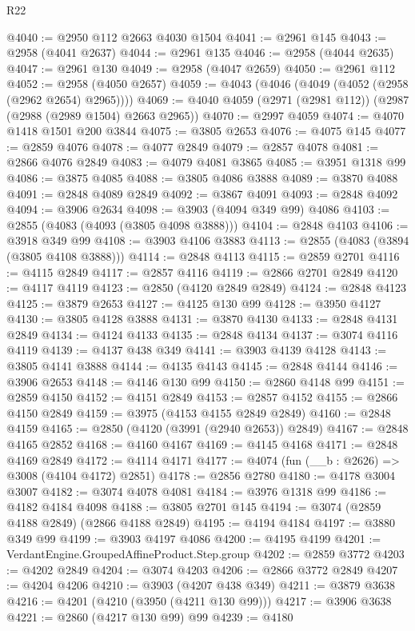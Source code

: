 \begin{lexlean}{R22}
\begin{coremodule}
@4040 := @2950 @112 @2663 @4030 @1504
@4041 := @2961 @145
@4043 := @2958 (@4041 @2637)
@4044 := @2961 @135
@4046 := @2958 (@4044 @2635)
@4047 := @2961 @130
@4049 := @2958 (@4047 @2659)
@4050 := @2961 @112
@4052 := @2958 (@4050 @2657)
@4059 := @4043 (@4046 (@4049 (@4052 (@2958 (@2962 @2654) @2965))))
@4069 := @4040 @4059 (@2971 (@2981 @112)) (@2987 (@2988 (@2989 @1504) @2663 @2965))
@4070 := @2997 @4059
@4074 := @4070 @1418 @1501 @200 @3844
@4075 := @3805 @2653
@4076 := @4075 @145
@4077 := @2859 @4076
@4078 := @4077 @2849
@4079 := @2857 @4078
@4081 := @2866 @4076 @2849
@4083 := @4079 @4081 @3865
@4085 := @3951 @1318 @99
@4086 := @3875 @4085
@4088 := @3805 @4086 @3888
@4089 := @3870 @4088
@4091 := @2848 @4089 @2849
@4092 := @3867 @4091
@4093 := @2848 @4092
@4094 := @3906 @2634
@4098 := @3903 (@4094 @349 @99) @4086
@4103 := @2855 (@4083 (@4093 (@3805 @4098 @3888)))
@4104 := @2848 @4103
@4106 := @3918 @349 @99
@4108 := @3903 @4106 @3883
@4113 := @2855 (@4083 (@3894 (@3805 @4108 @3888)))
@4114 := @2848 @4113
@4115 := @2859 @2701
@4116 := @4115 @2849
@4117 := @2857 @4116
@4119 := @2866 @2701 @2849
@4120 := @4117 @4119
@4123 := @2850 (@4120 @2849 @2849)
@4124 := @2848 @4123
@4125 := @3879 @2653
@4127 := @4125 @130 @99
@4128 := @3950 @4127
@4130 := @3805 @4128 @3888
@4131 := @3870 @4130
@4133 := @2848 @4131 @2849
@4134 := @4124 @4133
@4135 := @2848 @4134
@4137 := @3074 @4116 @4119
@4139 := @4137 @438 @349
@4141 := @3903 @4139 @4128
@4143 := @3805 @4141 @3888
@4144 := @4135 @4143
@4145 := @2848 @4144
@4146 := @3906 @2653
@4148 := @4146 @130 @99
@4150 := @2860 @4148 @99
@4151 := @2859 @4150
@4152 := @4151 @2849
@4153 := @2857 @4152
@4155 := @2866 @4150 @2849
@4159 := @3975 (@4153 @4155 @2849 @2849)
@4160 := @2848 @4159
@4165 := @2850 (@4120 (@3991 (@2940 @2653)) @2849)
@4167 := @2848 @4165 @2852
@4168 := @4160 @4167
@4169 := @4145 @4168
@4171 := @2848 @4169 @2849
@4172 := @4114 @4171
@4177 := @4074 (fun (__b : @2626) => @3008 (@4104 @4172) @2851)
@4178 := @2856 @2780
@4180 := @4178 @3004 @3007
@4182 := @3074 @4078 @4081
@4184 := @3976 @1318 @99
@4186 := @4182 @4184 @4098
@4188 := @3805 @2701 @145
@4194 := @3074 (@2859 @4188 @2849) (@2866 @4188 @2849)
@4195 := @4194 @4184
@4197 := @3880 @349 @99
@4199 := @3903 @4197 @4086
@4200 := @4195 @4199
@4201 := VerdantEngine.GroupedAffineProduct.Step.group
@4202 := @2859 @3772
@4203 := @4202 @2849
@4204 := @3074 @4203
@4206 := @2866 @3772 @2849
@4207 := @4204 @4206
@4210 := @3903 (@4207 @438 @349)
@4211 := @3879 @3638
@4216 := @4201 (@4210 (@3950 (@4211 @130 @99)))
@4217 := @3906 @3638
@4221 := @2860 (@4217 @130 @99) @99
@4239 := @4180

\end{coremodule}
\end{lexlean}
